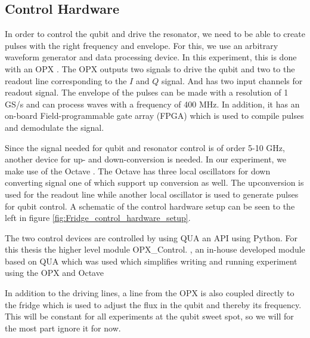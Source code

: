 \subsection{Control Hardware}
In order to control the qubit and drive the resonator, we need to be able to create pulses with the right frequency and envelope. For this, we use an arbitrary waveform generator and data processing device. In this experiment, this is done with an OPX \cite{noauthor_opx_nodate}. The OPX outputs two signals to drive the qubit and two to the readout line corresponding to the $I$ and $Q$ signal. And has two input channels for readout signal. The envelope of the pulses can be made with a resolution of 1 GS/s and can process waves with a frequency of 400 MHz. In addition, it has an on-board Field-programmable gate array (FPGA) which is used to compile pulses and demodulate the signal. 

Since the signal needed for qubit and resonator control is of order 5-10 GHz, another device for up- and down-conversion is needed. In our experiment, we make use of the Octave \cite{noauthor_octave_nodate}. The Octave has three local oscillators for down converting signal one of which support up conversion as well. The upconversion is used for the readout line while another local oscillator is used to generate pulses for qubit control. A schematic of the control hardware setup can be seen to the left in figure \ref{fig:Fridge_control_hardware_setup}.

The two control devices are controlled by using QUA  an API using Python. For this thesis the higher level module OPX\_Control\cite{hastrup_cqed_nodate}. , an in-house developed module based on QUA which   was used which simplifies writing and running experiment using the OPX and Octave 

In addition to the driving lines, a line from the OPX is also coupled directly to the fridge which is used to adjust the flux in the qubit and thereby its frequency. This will be constant for all experiments at the qubit sweet spot, so we will for the most part ignore it for now. 



